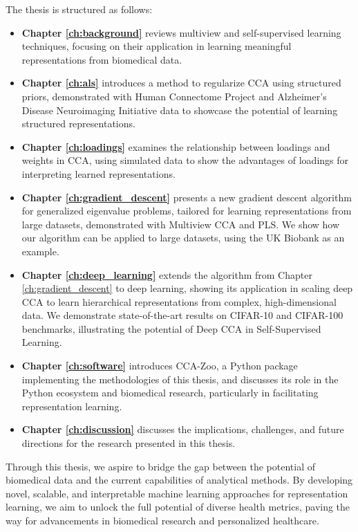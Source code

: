 The thesis is structured as follows:
\begin{itemize}
\item \textbf{Chapter \ref{ch:background}} reviews multiview and self-supervised learning techniques, focusing on their application in learning meaningful representations from biomedical data.
\item \textbf{Chapter \ref{ch:als}} introduces a method to regularize CCA using structured priors, demonstrated with Human Connectome Project and Alzheimer's Disease Neuroimaging Initiative data to showcase the potential of learning structured representations.
\item \textbf{Chapter \ref{ch:loadings}} examines the relationship between loadings and weights in CCA, using simulated data to show the advantages of loadings for interpreting learned representations.
\item \textbf{Chapter \ref{ch:gradient_descent}} presents a new gradient descent algorithm for generalized eigenvalue problems, tailored for learning representations from large datasets, demonstrated with Multiview CCA and PLS. We show how our algorithm can be applied to large datasets, using the UK Biobank as an example.
\item \textbf{Chapter \ref{ch:deep_learning}} extends the algorithm from Chapter \ref{ch:gradient_descent} to deep learning, showing its application in scaling deep CCA to learn hierarchical representations from complex, high-dimensional data. We demonstrate state-of-the-art results on CIFAR-10 and CIFAR-100 benchmarks, illustrating the potential of Deep CCA in Self-Supervised Learning.
\item \textbf{Chapter \ref{ch:software}} introduces CCA-Zoo, a Python package implementing the methodologies of this thesis, and discusses its role in the Python ecosystem and biomedical research, particularly in facilitating representation learning.
\item \textbf{Chapter \ref{ch:discussion}} discusses the implications, challenges, and future directions for the research presented in this thesis.
\end{itemize}

Through this thesis, we aspire to bridge the gap between the potential of biomedical data and the current capabilities of analytical methods. By developing novel, scalable, and interpretable machine learning approaches for representation learning, we aim to unlock the full potential of diverse health metrics, paving the way for advancements in biomedical research and personalized healthcare.